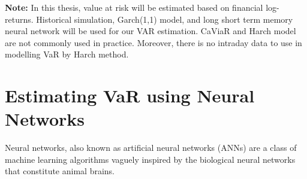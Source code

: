 \documentclass[a4paper,11pt,oneside]{book}
\begin{document}
\newline\newline
\textbf{Note:} In this thesis, value at risk will be estimated based on financial log-returns. Historical simulation, Garch(1,1) model, and long short term memory neural network will be used for our VAR estimation. CaViaR and Harch model are not commonly used in practice. Moreover, there is no intraday data to use in modelling VaR by Harch method.

\chapter{Estimating VaR using Neural Networks
}
Neural networks, also known as artificial neural networks (ANNs) are a class of machine learning algorithms vaguely inspired by the biological neural networks that constitute animal brains.\newline\newline
\end{document}
